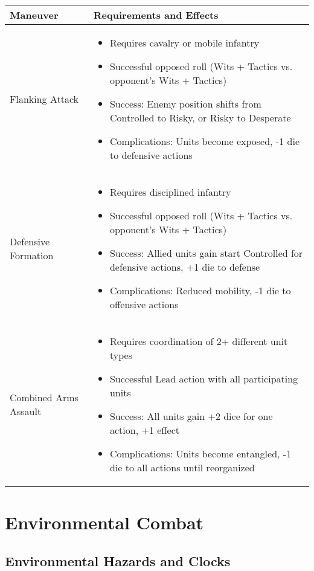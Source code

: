 \documentclass[11pt,letterpaper]{article}
\begin{document}
\begin{longtable}{|>{\raggedright\arraybackslash}p{4cm}|>{\raggedright\arraybackslash}p{8cm}|}
\hline
\textbf{Maneuver} & \textbf{Requirements and Effects} \\
\hline
Flanking Attack & 
\begin{itemize}
    \item Requires cavalry or mobile infantry
    \item Successful opposed roll (Wits + Tactics vs. opponent's Wits + Tactics)
    \item Success: Enemy position shifts from Controlled to Risky, or Risky to Desperate
    \item Complications: Units become exposed, -1 die to defensive actions
\end{itemize} \\
\hline
Defensive Formation & 
\begin{itemize}
    \item Requires disciplined infantry
    \item Successful opposed roll (Wits + Tactics vs. opponent's Wits + Tactics)
    \item Success: Allied units gain start Controlled for defensive actions, +1 die to defense
    \item Complications: Reduced mobility, -1 die to offensive actions
\end{itemize} \\
\hline
Combined Arms Assault & 
\begin{itemize}
    \item Requires coordination of 2+ different unit types
    \item Successful Lead action with all participating units
    \item Success: All units gain +2 dice for one action, +1 effect
    \item Complications: Units become entangled, -1 die to all actions until reorganized
\end{itemize} \\
\hline
\end{longtable}

\newpage

\section{Environmental Combat}

\subsection{Environmental Hazards and Clocks}
\end{document}
